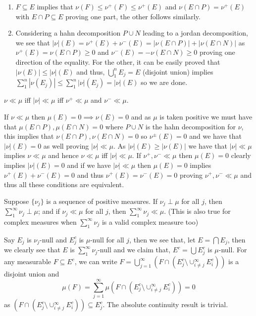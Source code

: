 \documentclass[12pt,a4paper]{article}
\begin{document}
\begin{solution}
\begin{enumerate}[label=\alph*.]
	\item $F \subseteq E$ implies that $\nu(F)\leq\nu^+(F)\leq\nu^+(E)$ and $\nu(E\cap P)=\nu^+(E)$ with $E\cap P \subseteq E$ proving one part, the other follows similarly.
	\item Considering a hahn decomposition $P\cup N$ leading to a jordan decomposition, we see that $|\nu|(E)=\nu^+(E)+\nu^-(E)=|\nu(E\cap P)|+|\nu(E\cap N)|$ as $\nu^+(E)=\nu(E\cap P)\geq 0$ and $\nu^-(E)=-\nu(E\cap N)\geq 0$ proving one direction of the equality. 
	For the other, it can be easily proved that $|\nu(E)|\leq|\nu|(E)$ and thus, $\bigcup_1^nE_j=E$ (disjoint union) implies $\sum_1^n|\nu(E_j)|\leq\sum_1^n|\nu|(E_j)=|\nu|(E)$ so we are done.
\end{enumerate}
\end{solution}
\begin{problem}\label{prob:3-8}
$\nu\ll\mu$ iff $|\nu|\ll\mu$ iff $\nu^{+}\ll\mu$ and $\nu^{-}\ll\mu$.
\end{problem}
\begin{solution}
If $\nu\ll\mu$ then $\mu(E)=0\implies\nu(E)=0$ and as $\mu$ is taken positive we must have that $\mu(E\cap P),\mu(E\cap N)=0$ where $P\cup N$ is the hahn decomposition for $\nu$, this implies that $\nu(E\cap P),\nu(E\cap N)=0$ so $\nu^\pm(E)=0$ and we have that $|\nu|(E)=0$ as well proving $|\nu|\ll\mu$. 
As $|\nu|(E)\geq|\nu(E)|$ we have that $|\nu|\ll\mu$ implies $\nu\ll\mu$ and hence $\nu\ll\mu$ iff $|\nu|\ll\mu$. 
If $\nu^+,\nu^-\ll\mu$ then $\mu(E)=0$ clearly implies $|\nu|(E)=0$ and if we have $|\nu|\ll\mu$ then $\mu(E)=0$ implies $\nu^+(E)+\nu^-(E)=0$ and thus $\nu^+(E)=\nu^-(E)=0$ proving $\nu^+,\nu^-\ll\mu$ and thus all these conditions are equivalent.
\end{solution}
\begin{problem}\label{prob:3-9}
Suppose $\{\nu_{j}\}$ is a sequence of positive measures. If $\nu_{j}\perp\mu$ for all $j$, then $\sum_{1}^{\infty}\nu_{j}\perp\mu$; and if $\nu_{j}\ll\mu$ for all $j$, then $\sum_{1}^{\infty}\nu_{j}\ll\mu$. (This is also true for complex measures when $\sum_1^\infty\nu_j$ is a valid complex measure too)
\end{problem}
\begin{solution}
Say $E_j$ is $\nu_j$-null and $E_j^c$ is $\mu$-null for all $j$, then we see that, let $E=\bigcap E_j$, then we clearly see that $E$ is $\sum_1^\infty\nu_j$-null and we claim that, $E^c=\bigcup E_j^c$ is $\mu$-null. 
For any measurable $F\subseteq E^c$, we can write $F=\bigcup_{j=1}^\infty(F\cap(E_j^c\setminus\cup_{i\neq j}^\infty E_i^c))$ is a disjoint union and 
\[
    \mu(F)= \sum_{j=1}^{\infty}\mu(F\cap(E_j^c\setminus\cup_{i\neq j}^\infty E_i^c))=0
\]
as $(F\cap(E_j^c\setminus\cup_{i\neq j}^\infty E_i^c)) \subseteq E_j^c$. 
The absolute continuity result is trivial. 
\end{solution}
\end{document}
